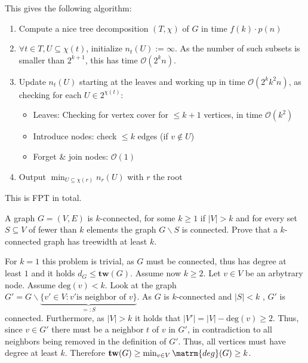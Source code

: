 \documentclass{article}
\begin{document}
\begin{solving}
    This gives the following algorithm:
    \begin{enumerate}
        \item Compute a nice tree decomposition $(T,\chi)$ of $G$ in time $f(k)\cdot p(n)$
        \item $\forall t\in T, U\subseteq \chi(t)$, initialize $n_t(U):= \infty$. As the number of such subsets is smaller than $2^{k+1}$, this has time $\mathcal O(2^kn)$.
        \item Update $n_t(U)$ starting at the leaves and working up in time $\mathcal O(2^k k^2 n)$, as checking for each $U\in 2^{\chi(t)}$:\begin{itemize}
            \item Leaves: Checking for vertex cover for $\leq k+1$ vertices, in time $\mathcal O(k^2)$
            \item Introduce nodes: check $\leq k$ edges (if $v\notin U$)
            \item Forget & join nodes: $\mathcal O(1)$
        \end{itemize}
        \item Output $\min _{U\subseteq \chi(r)}n_r(U)$ with $r$ the root
    \end{enumerate}
    This is FPT in total.
\end{solving}
\newpage

\begin{exercise}
    A graph $G = (V,E)$ is $k$-connected, for some $k\geq 1$ if $|V|>k$ and for every set $S\subseteq V$ of fewer than $k$ elements the graph $G\backslash S$ is connected. Prove that a $k$-connected graph has treewidth at least $k$.
\end{exercise}
\begin{solving}
 For $k = 1$ this problem is trivial, as $G$ must be connected, thus has degree at least $1$ and it holds $d_G\leq \mathbf{tw}(G)$. 
 Assume now $k\geq 2$. Let $v\in V$ be an arbytrary node. Assume $\mathrm{deg}(v)<k$. Look at the graph $G'  = G\backslash \underbrace{\{v'\in V: v'\text{is neighbor of }v\}}_{=: S}$. As $G$ is $k$-connected and $|S|<k$ , $G'$ is connected. Furthermore, as $|V|>k$ it holds that $|V'| = |V|-\mathrm{deg}(v) \geq 2$. Thus, since $v\in G'$ there must be a neighbor $t$ of $v$ in $G'$, in contradiction to all neighbors being removed in the definition of $G'$. Thus, all vertices must have degree at least $k$. Therefore $\mathbf{tw}(G)\geq \min_{v\in V}\matrm{deg}(G)\geq k$.
\end{solving}
\newpage
\end{document}
